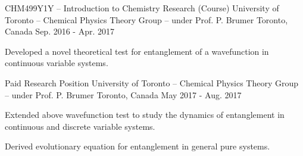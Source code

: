 \begin{cventries}
  \cventry
    {CHM499Y1Y -- Introduction to Chemistry Research (Course)} %
    {University of Toronto -- Chemical Physics Theory Group -- under Prof. P. Brumer} %
    {Toronto, Canada} %
    {Sep. 2016 - Apr. 2017} %
    {
      \begin{cvitems} %
        \item{Developed a novel theoretical test for entanglement of a
            wavefunction in continuous variable systems.}
      \end{cvitems}
    }

  \cventry
    {Paid Research Position} %
    {University of Toronto -- Chemical Physics Theory Group -- under Prof. P. Brumer} %
    {Toronto, Canada} %
    {May 2017 - Aug. 2017} %
    {
      \begin{cvitems} %
        \item{Extended above wavefunction test to study the dynamics of entanglement
            in continuous and discrete variable systems.}
        \item{Derived evolutionary equation for entanglement in general pure systems.}
      \end{cvitems}
    }

\end{cventries}
